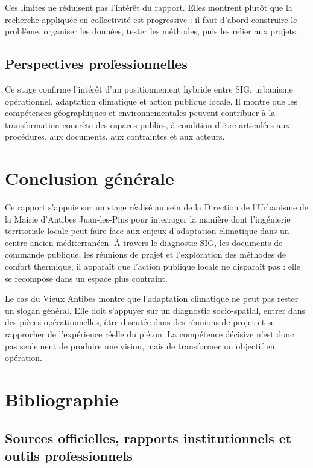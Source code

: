 \documentclass[11pt,a4paper]{report}
\begin{document}
Ces limites ne réduisent pas l'intérêt du rapport. Elles montrent plutôt que la recherche appliquée en collectivité est progressive : il faut d'abord construire le problème, organiser les données, tester les méthodes, puis les relier aux projets.

\section{Perspectives professionnelles}

Ce stage confirme l'intérêt d'un positionnement hybride entre SIG, urbanisme opérationnel, adaptation climatique et action publique locale. Il montre que les compétences géographiques et environnementales peuvent contribuer à la transformation concrète des espaces publics, à condition d'être articulées aux procédures, aux documents, aux contraintes et aux acteurs.

\chapter*{Conclusion générale}

Ce rapport s'appuie sur un stage réalisé au sein de la Direction de l'Urbanisme de la Mairie d'Antibes Juan-les-Pins pour interroger la manière dont l'ingénierie territoriale locale peut faire face aux enjeux d'adaptation climatique dans un centre ancien méditerranéen. À travers le diagnostic SIG, les documents de commande publique, les réunions de projet et l'exploration des méthodes de confort thermique, il apparaît que l'action publique locale ne disparaît pas : elle se recompose dans un espace plus contraint.

Le cas du Vieux Antibes montre que l'adaptation climatique ne peut pas rester un slogan général. Elle doit s'appuyer sur un diagnostic socio-spatial, entrer dans des pièces opérationnelles, être discutée dans des réunions de projet et se rapprocher de l'expérience réelle du piéton. La compétence décisive n'est donc pas seulement de produire une vision, mais de transformer un objectif en opération.

\chapter*{Bibliographie}

\section*{Sources officielles, rapports institutionnels et outils professionnels}
\end{document}
